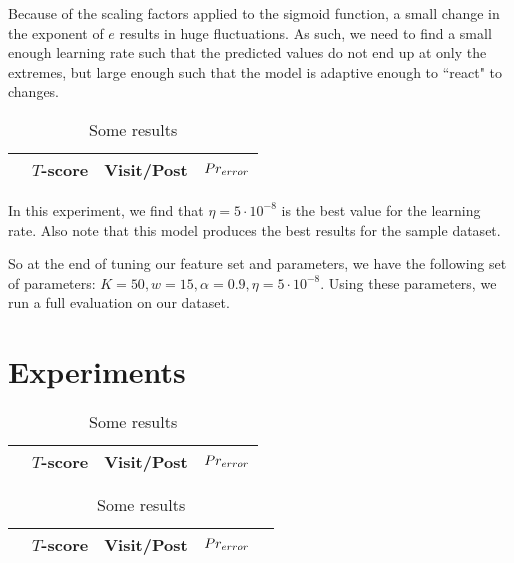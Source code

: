 Because of the scaling factors applied to the sigmoid function, a small change 
in the exponent of $e$ results in huge fluctuations. As such, we need to find a 
small enough learning rate such that the predicted values do not end up at only 
the extremes, but large enough such that the model is adaptive enough to 
``react" to changes.

\begin{table}
\begin{center}
\begin{tabular}{| l | c | c | c |}
\hline
& $T$-score			   &	Visit/Post & 	$Pr_{error}$\\
\hline
	
\hline
\end{tabular}
\end{center}
\caption{Some results}\label{tbl:par_tune_learning}
\end{table}

In this experiment, we find that $\eta=5\cdot10^{-8}$ is the best value for the 
learning rate. Also note that this model produces the best results for the 
sample dataset.


So at the end of tuning our feature set and parameters, we have the following 
set of parameters: $K = 50, w = 15, \alpha = 0.9, \eta = 5\cdot10^{-8}$. Using 
these parameters, we run a full evaluation on our dataset.

\section{Experiments}


\begin{table}
\begin{center}
\begin{tabular}{| l | c | c | c |}
\hline
& $T$-score			   &	Visit/Post & 	$Pr_{error}$\\
\hline
	
\hline
\end{tabular}
\end{center}
\caption{Some results}\label{tbl:full_eval}
\end{table}


\begin{table}
\begin{center}
\begin{tabular}{| l | c | c | c | l |}
\hline
& $T$-score			   &	Visit/Post & 	$Pr_{error}$ &\\
\hline
	
\hline
\end{tabular}
\end{center}
\caption{Some results}\label{tbl:diff_efal}
\end{table}



